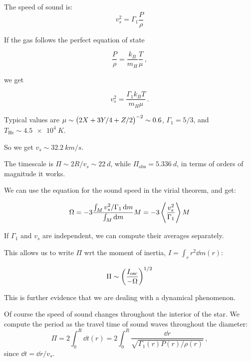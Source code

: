 \documentclass[main.tex]{subfiles}
\begin{document}
The speed of sound is:
%
\begin{equation}
  v_s^2 = \Gamma_1 \frac{P}{\rho}
\end{equation}

If the gas follows the perfect equation of state

\begin{equation}
  \frac{P}{\rho} = \frac{k_B}{m_H} \frac{T}{\mu}  \,,
\end{equation}

we get

\begin{equation}
  v_s^2 = \frac{\Gamma_1 k_B T}{m_H \mu}  \,.
\end{equation}

Typical values are \(\mu \sim \qty(2X + 3Y/4 + Z/2)^{-2} \sim 0.6\), \(\Gamma_1 = 5/3\), and \(T_{\text{He}} \sim \SI{4.5e4}{K} \).

So we get \(v_s \sim \SI{32.2}{km/s}\).

The timescale is \(\Pi \sim 2R/v_s \sim \SI{22}{d}\), while \(\Pi_{\text{obs}} = \SI{5.336}{d} \), in terms of orders of magnitude it works.

We can use the equation for the sound speed in the virial theorem, and get:

\begin{equation}
  \Omega = - 3 \frac{\int _{M}  v_s^2 / \Gamma_1 \dd{m}}{\int_M \dd{m}}M = -3 \expval{\frac{v_s^2}{\Gamma_1}} M
\end{equation}

If \(\Gamma_1 \) and \(v_s\) are independent, we can compute their averages separately.

This allows us to write \(\Pi  \) wrt the moment of inertia, \(I = \int_r r^2 \dd{m}(r)\):

\begin{equation}
  \Pi \sim \qty(\frac{I_{\text{osc}}}{-\Omega} )^{1/2}
\end{equation}

This is further evidence that we are dealing with a dynamical phenomenon.

Of course the speed of sound changes throughout the interior of the star.
We compute the period as the travel time of sound waves throughout the diameter:
%
\begin{equation}
  \Pi = 2 \int _{0}   ^{R} \dd{t(r)} = 2 \int_0^R \frac{\dd{r} }{\sqrt{\Gamma_1(r) P(r) / \rho(r)}}\,,
\end{equation}
%
since \(\dd{t} = \dd{r} / v_s\).
\end{document}
